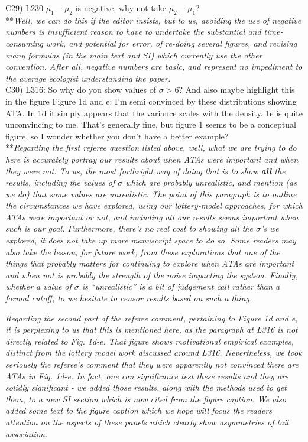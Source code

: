 \documentclass[letterpaper,11pt]{article}
\begin{document}
\noindent C29) L230 $\mu_1-\mu_2$ is negative, why not take $\mu_2-\mu_1$? \\

\noindent ***\emph{Well, we can do this if the editor insists, but to us, avoiding the use of
negative numbers is insufficient reason to have to undertake the substantial and time-consuming 
work, and potential for error, 
of re-doing several figures, and revising many formulas (in the main text and SI) which currently use the other convention.
After all, negative numbers are basic, and represent no impediment to the average ecologist understanding the 
paper.} \\

\noindent C30) L316: So why do you show values of $\sigma >6$? And also maybe highlight this in the figure Figure 1d and e: I’m semi convinced by these distributions showing ATA. In 1d it simply appears that the variance scales with the density. 1e is quite unconvincing to me. That’s generally fine, but figure 1 seems to be a conceptual figure, so I wonder whether you don’t have a better example? \\

\noindent ***\emph{Regarding the first referee question listed above, well, what we are 
trying to do here is accurately portray our results about
when ATAs were important and when they were not. To us, the most forthright way of doing that is to
show \textbf{all} the results, including the values of $\sigma$ which are probably unrealistic, and mention
(as we do) that some values are unrealistic. The point of this paragraph is to outline the circumstances
we have explored, using our lottery-model approaches, for which ATAs were important or not, and including all
our results seems important when such is our goal. Furthermore, there's no real cost to showing
all the $\sigma$'s we explored, it does not take up more manuscript space to do so.
Some readers may also take the lesson, for future work, from these explorations that one of the things that probably 
matters for continuing to explore when ATAs are important and when not is probably the strength
of the noise impacting the system. Finally, whether a value of $\sigma$ is ``unrealistic'' is 
a bit of judgement call rather than a formal cutoff, to we hesitate to censor results 
based on such a thing.}

\emph{Regarding the second part of the referee comment, pertaining to Figure 1d and e, it is perplexing to us that 
this is mentioned here,
as the paragraph at L316 is not directly related to Fig. 1d-e. That figure
shows motivational empirical examples, distinct from the lottery model work discussed around L316. Nevertheless, we took
seriously the referee's comment that they were apparently not convinced there are ATAs in Fig. 1d-e.
In fact, one can significance test these results and they are solidly significant - we added
those results, along with the methods used to get them, to a new SI section which is now cited from the
figure caption. We also added some text to the figure caption which we hope will focus the 
readers attention on the aspects of these panels which clearly show asymmetries of tail association. } \\
\end{document}
